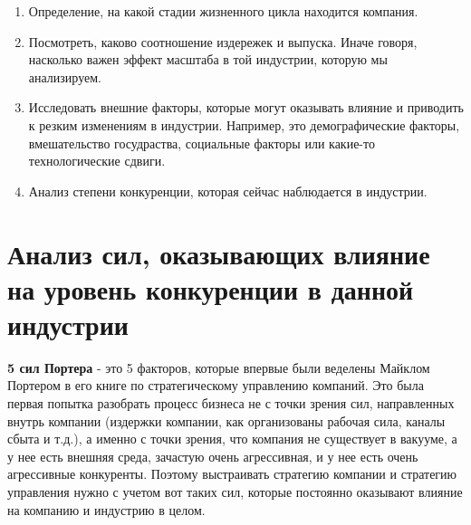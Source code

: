 \documentclass{article}
\begin{document}
\begin{enumerate}
	\item Определение, на какой стадии жизненного цикла находится компания.
	
	\item Посмотреть, каково соотношение издережек и выпуска. Иначе говоря, насколько важен эффект масштаба в той индустрии, которую мы анализируем.
	
	\item Исследовать внешние факторы, которые могут оказывать влияние и приводить к резким изменениям в индустрии. Например, это демографические факторы, вмешательство госудраства, социальные факторы или какие-то технологические сдвиги.
	
	\item Анализ степени конкуренции, которая сейчас наблюдается в индустрии. 
	
	\end{enumerate}
	
	\section{Анализ сил, оказывающих влияние на уровень конкуренции в данной индустрии}
	
	\textbf{5 сил Портера} - это 5 факторов, которые впервые были веделены Майклом Портером в его книге по стратегическому управлению компаний. Это была первая попытка разобрать процесс бизнеса не с точки зрения сил, направленных внутрь компании (издержки компании, как организованы рабочая сила, каналы сбыта и т.д.), а именно с точки зрения, что компания не существует в вакууме, а у нее есть внешняя среда, зачастую очень агрессивная, и у нее есть очень агрессивные конкуренты. Поэтому выстраивать стратегию компании и стратегию управления нужно с учетом вот таких сил, которые постоянно оказывают влияние на компанию и индустрию в целом.
	
\end{document}
